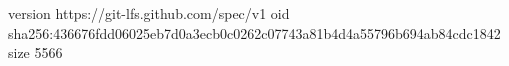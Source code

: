 version https://git-lfs.github.com/spec/v1
oid sha256:436676fdd06025eb7d0a3ecb0c0262c07743a81b4d4a55796b694ab84cdc1842
size 5566
